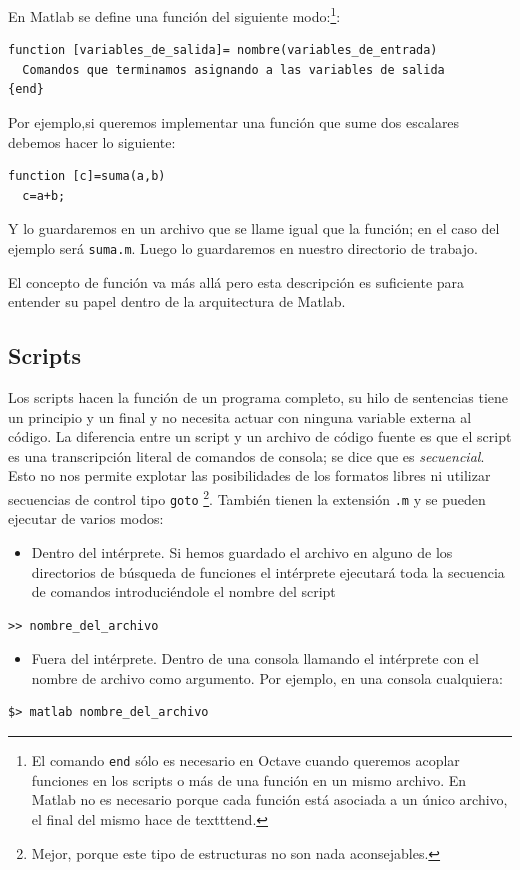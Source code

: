 En Matlab se define una función del siguiente modo:\footnote{El comando
  \texttt{end} sólo es necesario en Octave cuando queremos acoplar
  funciones en los scripts o más de una función en un mismo archivo.
  En Matlab no es necesario porque cada función está asociada a un
  único archivo, el final del mismo hace de texttt{end}.}:

\begin{lstlisting}
function [variables_de_salida]= nombre(variables_de_entrada)
  Comandos que terminamos asignando a las variables de salida
{end}
\end{lstlisting}
 
Por ejemplo,si queremos implementar una función que sume dos escalares 
debemos hacer lo siguiente:

\begin{lstlisting}
function [c]=suma(a,b)
  c=a+b;
\end{lstlisting}

Y lo guardaremos en un archivo que se llame igual que la función; en
el caso del ejemplo será \texttt{suma.m}. Luego lo guardaremos en nuestro
directorio de trabajo.

El concepto de función va más allá pero esta descripción es suficiente
para entender su papel dentro de la arquitectura de Matlab.


\subsection{Scripts}

Los scripts hacen la función de un programa completo, su hilo de
sentencias tiene un principio y un final y no necesita actuar con
ninguna variable externa al código. La diferencia entre un
script y un archivo de código fuente es que el script es
una transcripción literal de comandos de consola; se dice que es
\emph{secuencial}.  Esto no nos permite explotar las posibilidades de
los formatos libres ni utilizar secuencias de control tipo
\texttt{goto}%
\footnote{Mejor, porque este tipo de estructuras no son nada
  aconsejables.%
}. También tienen la extensión \texttt{.m} y se pueden ejecutar de
varios modos:

\begin{itemize}
\item Dentro del intérprete. Si hemos guardado el archivo en alguno de
  los directorios de búsqueda de funciones el intérprete ejecutará
  toda la secuencia de comandos introduciéndole el nombre del script
\end{itemize}
\begin{lstlisting}
>> nombre_del_archivo
\end{lstlisting}
\begin{itemize}
\item Fuera del intérprete. Dentro de una consola llamando el
  intérprete con el nombre de archivo como argumento. Por ejemplo, en
  una consola cualquiera:
\end{itemize}
\begin{lstlisting}
$> matlab nombre_del_archivo
\end{lstlisting}

